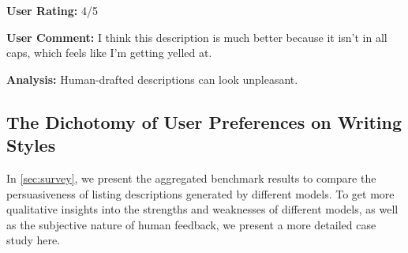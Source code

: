 \begin{center}
\begin{tcolorbox}[colback=white,colframe=gray!20,width=0.95\textwidth]
    {\footnotesize \textbf{User Rating:} 4/5 }
    \vspace{0.2em}

    {\footnotesize \textbf{User Comment:} I think this description is much better because it isn't in all caps, which feels like I'm getting yelled at. }
    \vspace{0.2em}

   {\footnotesize \textbf{Analysis:} Human-drafted descriptions can look unpleasant.  }
    \end{tcolorbox}\end{center}

\subsection{The Dichotomy of User Preferences on Writing Styles}
\label{sec: case-study-for-main-benchmark}
In \cref{sec:survey}, we present the aggregated benchmark results to compare the persuasiveness of listing descriptions generated by different models. To get more qualitative insights into the strengths and weaknesses of different models, as well as the subjective nature of human feedback, we present a more detailed case study here. 

